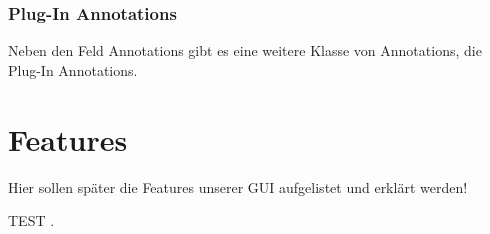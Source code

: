 \documentclass[a4paper, 11pt]{article} %
\begin{document}

\subsubsection{Plug-In Annotations} %
\label{ssub:subsection_name}
Neben den Feld Annotations gibt es eine weitere Klasse von Annotations, die Plug-In Annotations. 

\section{Features} %
\label{sec:features}
Hier sollen später die Features unserer GUI aufgelistet und erklärt werden!

TEST \cite{dummy:svs}.





\end{document}
